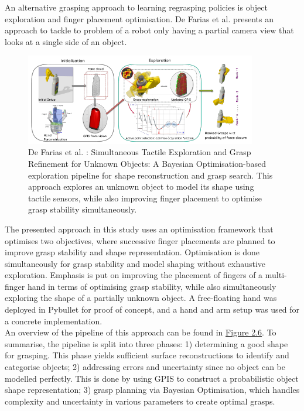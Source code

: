 \documentclass[11pt, a4paper]{report}
\begin{document}
An alternative grasping approach to learning regrasping policies is object exploration and finger placement optimisation. De Farias et al. \cite{de_Farias_2021} presents an approach to tackle to problem of a robot only having a partial camera view that looks at a single side of an object.
\begin{figure}[H]
    \centering
    \includegraphics[width=0.9\textwidth]{docs/Project Report/Media/2_3_de_farias_network.png}
    \caption{De Farias et al. \cite{de_Farias_2021}: Simultaneous Tactile Exploration and Grasp Refinement for Unknown Objects: A Bayesian Optimisation-based exploration pipeline for shape reconstruction and grasp search. This approach explores an unknown object to model its shape using tactile sensors, while also improving finger placement to optimise grasp stability simultaneously.}
    \label{fig:2.6}
\end{figure}
The presented approach in this study uses an optimisation framework that optimises two objectives, where successive finger placements are planned to improve grasp stability and shape representation. Optimisation is done simultaneously for grasp stability and model shaping without exhaustive exploration. Emphasis is put on improving the placement of fingers of a multi-finger hand in terms of optimising grasp stability, while also simultaneously exploring the shape of a partially unknown object. A free-floating hand was deployed in Pybullet for proof of concept, and a hand and arm setup was used for a concrete implementation.\\

An overview of the pipeline of this approach can be found in \hyperref[fig:2.6]{Figure 2.6}. To summarise, the pipeline is split into three phases: 1) determining a good shape for grasping. This phase yields sufficient surface reconstructions to identify and categorise objects; 2) addressing errors and uncertainty since no object can be modelled perfectly. This is done by using GPIS to construct a probabilistic object shape representation; 3) grasp planning via Bayesian Optimisation, which handles complexity and uncertainty in various parameters to create optimal grasps.
\end{document}
